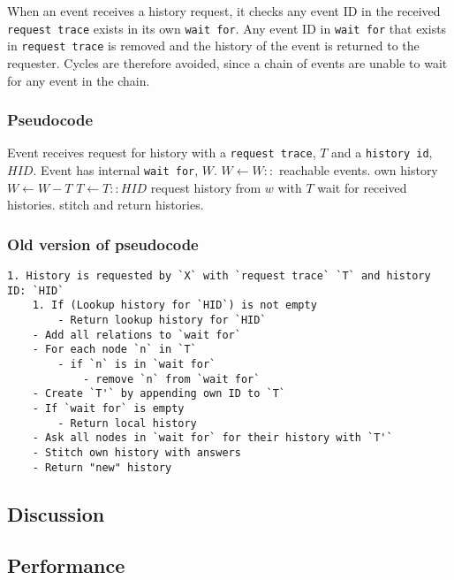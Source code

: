When an event receives a history request, it checks any event ID in the received \texttt{request trace} exists in its own \texttt{wait for}. Any event ID in \texttt{wait for} that exists in \texttt{request trace} is removed and the history of the event is returned to the requester. 
Cycles are therefore avoided, since a chain of events are unable to wait for any event in the chain. \bigskip 


\subsubsection*{Pseudocode}
\begin{algorithmic}
	\State Event receives request for history with a \texttt{request trace}, $T$ and a \texttt{history id}, $HID$. 
	\State Event has internal \texttt{wait for}, $W$.
	\State
	\State $W\gets W::$ reachable events.
	\Return own history
	\Else
	\State $W\gets W-T$
	\State $T\gets T::HID$
	\State
	 request history from $w$ with $T$ \EndFor
	\State wait for received histories.
	\State stitch and return histories. 
	\EndIf
\end{algorithmic}

\subsubsection*{Old version of pseudocode}
\begin{lstlisting}[breaklines=true]
 1. History is requested by `X` with `request trace` `T` and history ID: `HID`
    1. If (Lookup history for `HID`) is not empty
        - Return lookup history for `HID`
    - Add all relations to `wait for`
    - For each node `n` in `T`
        - if `n` is in `wait for`
            - remove `n` from `wait for`
    - Create `T'` by appending own ID to `T`
    - If `wait for` is empty
        - Return local history
    - Ask all nodes in `wait for` for their history with `T'`
    - Stitch own history with answers
    - Return "new" history
\end{lstlisting}

\subsection{Discussion} %
\subsection{Performance} %